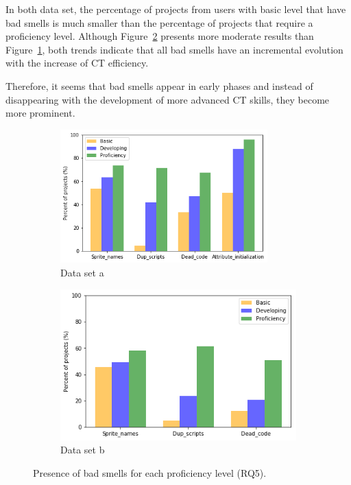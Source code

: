 In both data set, the percentage of projects from users with basic level that have bad smells is much smaller than the percentage of projects that require a proficiency level. Although Figure~\ref{subfig:rq5_results_b} presents more moderate results than Figure~\ref{subfig:rq5_results_a}, both trends indicate that all bad smells have an incremental evolution with the increase of CT efficiency.

Therefore, it seems that bad smells appear in early phases and instead of disappearing with the development of more advanced CT skills, they become more prominent.

\begin{figure}
    \begin{subfigure}{.5\textwidth}
    \centering
    \includegraphics[width=8cm]{img/rq5_dataset_a.png}
    \caption{Data set a}
    \label{subfig:rq5_results_a}
  \end{subfigure}
  \begin{subfigure}{9cm}
    \centering
    \includegraphics[width=8Cm]{img/rq5_dataset_b.png}
    \caption{Data set b}
    \label{subfig:rq5_results_b}
  \end{subfigure}
    \caption{Presence of bad smells for each proficiency level (RQ5).}
    \label{fig:rq5_result}
\end{figure}


